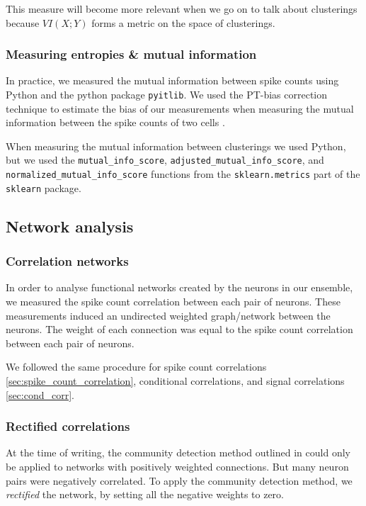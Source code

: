 \documentclass[a4paper,12pt]{article}
\theoremstyle{definition}
\begin{document}
        This measure will become more relevant when we go on to talk about clusterings because $VI(X;Y)$ forms a metric on the space of clusterings.

        \subsubsection{Measuring entropies \& mutual information}
        In practice, we measured the mutual information between spike counts using Python and the python package \texttt{pyitlib}. We used the PT-bias correction technique to estimate the bias of our measurements when measuring the mutual information between the spike counts of two cells \cite{treves}.

        When measuring the mutual information between clusterings we used Python, but we used the \texttt{mutual\_info\_score}, \texttt{adjusted\_mutual\_info\_score}, and \\ \texttt{normalized\_mutual\_info\_score} functions from the \texttt{sklearn.metrics} part of the \texttt{sklearn} package.

    \subsection{Network analysis}
        \subsubsection{Correlation networks}
        In order to analyse functional networks created by the neurons in our ensemble, we measured the spike count correlation between each pair of neurons. These measurements induced an undirected weighted graph/network between the neurons. The weight of each connection was equal to the spike count correlation between each pair of neurons.

        We followed the same procedure for spike count correlations \ref{sec:spike_count_correlation}, conditional correlations, and signal correlations \ref{sec:cond_corr}.

        \subsubsection{Rectified correlations}
        At the time of writing, the community detection method outlined in \cite{humphries} could only be applied to networks with positively weighted connections. But many neuron pairs were negatively correlated. To apply the community detection method, we \textit{rectified} the network, by setting all the negative weights to zero.
\end{document}
